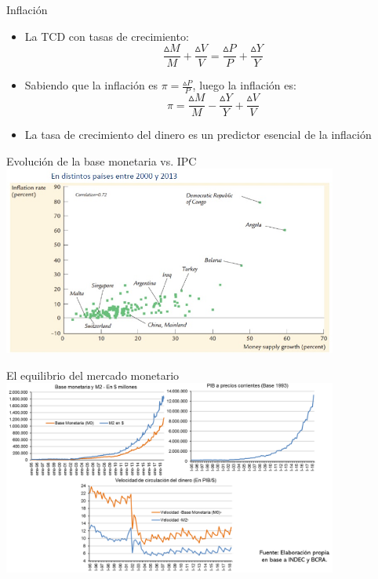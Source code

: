 \documentclass{beamer}
\begin{document}
\begin{frame}{Inflación}
    \begin{itemize}
    \item La TCD con tasas de crecimiento: \\
$$\frac{\vartriangle M}{M} + \frac{\vartriangle V}{V} = \frac{\vartriangle P}{P} + \frac{\vartriangle Y}{Y}$$ \vspace{1mm}
    \item Sabiendo que la inflación es $\pi = \frac{\vartriangle P}{P}$, luego la inflación es: \\
    $$\pi = \frac{\vartriangle M}{M} - \frac{\vartriangle Y}{Y} + \frac{\vartriangle V}{V}$$ \vspace{1mm}
    \item La tasa de crecimiento del dinero es un predictor esencial de la inflación
    \end{itemize}
\end{frame}

\begin{frame}{Evolución de la base monetaria vs. IPC}
\centering\includegraphics[width=11cm]{../Figures/C33.4.jpg}\
\end{frame}


\begin{frame}{El equilibrio del mercado monetario}
\centering\includegraphics[width=11cm]{../Figures/P56.png}\
\end{frame}
\end{document}
